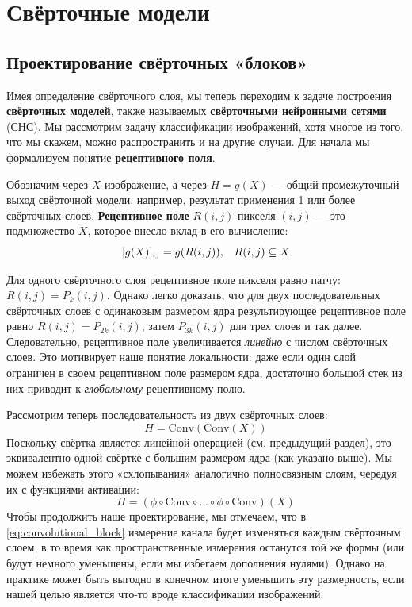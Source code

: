 \section{Свёрточные модели}

\subsection{Проектирование свёрточных «блоков»}

Имея определение свёрточного слоя, мы теперь переходим к задаче построения \textbf{свёрточных моделей}, также называемых \textbf{свёрточными нейронными сетями} (СНС). Мы рассмотрим задачу классификации изображений, хотя многое из того, что мы скажем, можно распространить и на другие случаи. Для начала мы формализуем понятие \textbf{рецептивного поля}.

\begin{definition}
Обозначим через $X$ изображение, а через $H = g(X)$ — общий промежуточный выход свёрточной модели, например, результат применения 1 или более свёрточных слоев. \textbf{Рецептивное поле} $R(i,j)$ пикселя $(i,j)$ — это подмножество $X$, которое внесло вклад в его вычисление:
$$
 \idx{g(X)}{ij} = g(R(i,j)), \;\;\; R(i,j) \subseteq X
$$
%
\end{definition}

Для одного свёрточного слоя рецептивное поле пикселя равно патчу: $R(i,j) = P_{k}(i,j)$. Однако легко доказать, что для двух последовательных свёрточных слоев с одинаковым размером ядра результирующее рецептивное поле равно $R(i,j) = P_{2k}(i,j)$, затем $P_{3k}(i,j)$ для трех слоев и так далее. Следовательно, рецептивное поле увеличивается \textit{линейно} с числом свёрточных слоев. Это мотивирует наше понятие локальности: даже если один слой ограничен в своем рецептивном поле размером ядра, достаточно большой стек из них приводит к \textit{глобальному} рецептивному полю.

Рассмотрим теперь последовательность из двух свёрточных слоев:
%
$$
H=\text{Conv}(\text{Conv}(X))
$$
%
Поскольку свёртка является линейной операцией (см. предыдущий раздел), это эквивалентно одной свёртке с большим размером ядра (как указано выше). Мы можем избежать этого «схлопывания» аналогично полносвязным слоям, чередуя их с функциями активации:
%
\begin{equation}
H = (\phi \circ \text{Conv}\circ\ldots\circ\phi\circ\text{Conv})(X)
\label{eq:convolutional_block}
\end{equation}
%
Чтобы продолжить наше проектирование, мы отмечаем, что в \eqref{eq:convolutional_block} измерение канала будет изменяться каждым свёрточным слоем, в то время как пространственные измерения останутся той же формы (или будут немного уменьшены, если мы избегаем дополнения нулями). Однако на практике может быть выгодно в конечном итоге уменьшить эту размерность, если нашей целью является что-то вроде классификации изображений.

